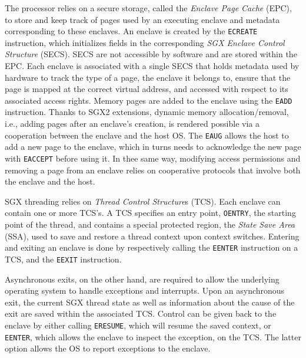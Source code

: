 The processor relies on a secure storage, called the \emph{Enclave Page Cache} (EPC), to store and keep track of pages used by an executing enclave and metadata corresponding to these enclaves.
An enclave is created by the \lstinline{ECREATE} instruction, which initializes fields in the corresponding \emph{SGX Enclave Control Structure} (SECS).
SECS are not accessible by software and are stored within the EPC.
Each enclave is associated with a single SECS that holds metadata used by hardware to track the type of a page, the enclave it belongs to, ensure that the page is mapped at the correct virtual address, and accessed with respect to its associated access rights.
Memory pages are added to the enclave using the \lstinline{EADD} instruction.
Thanks to SGX2 extensions, dynamic memory allocation/removal, i.e., adding pages after an enclave's creation, is rendered possible via a cooperation between the enclave and the host OS.
The \lstinline{EAUG} allows the host to add a new page to the enclave, which in turns needs to acknowledge the new page with \lstinline{EACCEPT} before using it.
In thee same way, modifying access permissions and removing a page from an enclave relies on cooperative protocols that involve both the enclave and the host.

SGX threading relies on \emph{Thread Control Structure}s (TCS).
Each enclave can contain one or more TCS's.
A TCS specifies an entry point, \lstinline{OENTRY}, the starting point of the thread, and contains a special protected region, the \emph{State Save Area} (SSA), used to save and restore a thread context upon context switches.
Entering and exiting an enclave is done by respectively calling the \lstinline{EENTER} instruction on a TCS, and the \lstinline{EEXIT} instruction.

Asynchronous exits, on the other hand, are required to allow the underlying operating system to handle exceptions and interrupts.
Upon an asynchronous exit, the current SGX thread state as well as information about the cause of the exit are saved within the associated TCS.
Control can be given back to the enclave by either calling \lstinline{ERESUME}, which will resume the saved context, or \lstinline{EENTER}, which allows the enclave to inspect the exception, on the TCS.
The latter option allows the OS to report exceptions to the enclave.

